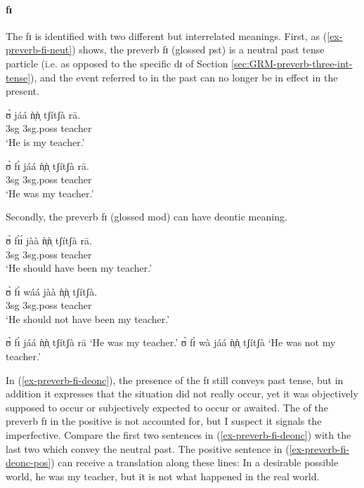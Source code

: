 \begin{exe}
\begin{exe}
\begin{exe}
\begin{exe}
\begin{exe}
\begin{exe}
\begin{exe}
\begin{exe}
\begin{exe}
\begin{exe}
\begin{exe}
\begin{exe}
\paragraph{fɪ}

The  {\sls fɪ}   is identified with two different but interrelated 
meanings.  First, as (\ref{ex-preverb-fi-neut}) shows, the preverb {\sls fɪ}  
(glossed {\sc pst}) is a neutral past tense particle (i.e.  as opposed to the 
specific  {\sls dɪ} of  Section \ref{sec:GRM-preverb-three-int-tense}), and the 
event referred to in the past can no longer be in effect in the present.


\ea\label{ex-preverb-fi-neut}

\ea
\gll ʊ̀ jáá  ǹ̩ǹ̩ tʃítʃà rā.\\
  {\sc 3sg} {\ident} {\sc 3sg.poss}  teacher {\foc}\\
\glt  `He is my {\sc teacher}.' 

\ex
\gll   ʊ̀  fɪ̀ jáá  ǹ̩ǹ̩ tʃítʃà  rā.\\
  {\sc 3sg} {\pst} {\ident} {\sc 3sg.poss}  teacher {\foc}\\
\glt  `He was my {\sc teacher}.' 

\z 
 \z 

 Secondly, the preverb {\sls fɪ}   (glossed {\sc mod}) can have  deontic
meaning.  


\ea\label{ex-preverb-fi-deonc}

\ea\label{ex-preverb-fi-deonc-pos}
\gll ʊ̀ fɪ̀ɪ́ jàà  ǹ̩ǹ̩ tʃítʃà rā.\\
  {\sc 3sg}  {\mod}  {\ident} {\sc 3sg.poss}  teacher {\foc}\\
\glt  `He should have been my {\sc teacher}.' 

\ex
\gll ʊ̀ fɪ̀ wáá jàà  ǹ̩ǹ̩ tʃítʃà.\\
  {\sc 3sg} {\mod} {\neg} {\ident} {\sc 3sg.poss}  teacher\\
\glt   `He should not have been my {\sc teacher}.'  


\ex
 ʊ̀  fɪ̀ jáá  ǹ̩ǹ̩ tʃítʃà  rā  {\rm `He was my {\sc teacher}.'}
\ex
 ʊ̀  fɪ̀ wà jáá  ǹ̩ǹ̩ tʃítʃà {\rm `He was not my teacher.'}

\z 
 \z 


In (\ref{ex-preverb-fi-deonc}),  the  presence of the  {\sls fɪ} still conveys  past tense, but in addition it expresses that the situation did not really occur, yet it was objectively supposed to occur or subjectively expected to occur or awaited. The  of the preverb {\sls fɪ} in the positive  is not accounted for, but I suspect it  signals the imperfective. Compare the first two sentences in (\ref{ex-preverb-fi-deonc}) with the last two  which convey the neutral past.  The positive sentence in (\ref{ex-preverb-fi-deonc-pos}) can receive  a translation along these lines:  In a desirable possible world, he was my teacher, but it is not what happened in the real world. 



\end{exe}
\end{exe}
\end{exe}
\end{exe}
\end{exe}
\end{exe}
\end{exe}
\end{exe}
\end{exe}
\end{exe}
\end{exe}
\end{exe}
